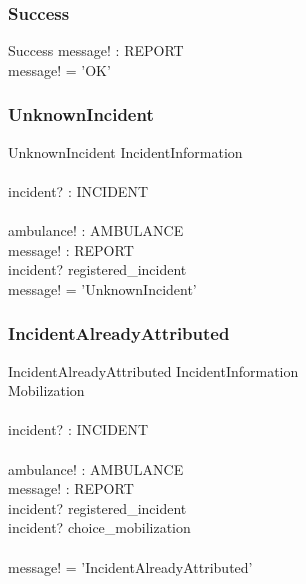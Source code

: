 \documentclass[12pt]{article}
\begin{document}
\subsubsection{Success}

\begin{schema}{Success}
	message! : REPORT	\\
  \where				
	message! = 'OK'		\\
\end{schema}

\subsubsection{UnknownIncident}

\begin{schema}{UnknownIncident}
	\Xi IncidentInformation	\\
	\newline				\\
	incident? : INCIDENT	\\
	\newline				\\
	ambulance! : AMBULANCE	\\
	message! : REPORT		\\
  \where  
	incident? \notin registered\_incident \\
	message! = 'UnknownIncident'
\end{schema}

\subsubsection{IncidentAlreadyAttributed}

\begin{schema}{IncidentAlreadyAttributed}
	\Xi IncidentInformation	\\
	\Xi Mobilization		\\
	\newline				\\
	incident? : INCIDENT	\\
	\newline				\\
	ambulance! : AMBULANCE	\\
	message! : REPORT		\\
  \where
  	incident? \in registered\_incident \\
  	incident? \in \ran choice\_mobilization \\
  	\newline \\
  	message! = 'IncidentAlreadyAttributed'
\end{schema}
\end{document}
